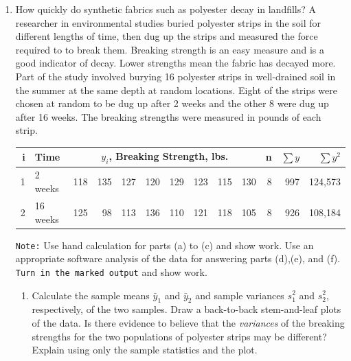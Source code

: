 \documentclass[11pt]{article}
\begin{document}
\begin{enumerate}
\begin{enumerate}
\item Assess the validity of the three conditions necessary for the test used in
part (b) to be valid. Give reasons for assuming that these are satisfied or not to
an acceptable degree? 

\item  On your output, circle the t-statistic for testing the hypothesis you stated in Part (b)and
the p-value associated with it in your output. Extract them from your output
and write them here also.
\item  Extract the  90\% confidence interval for the difference in population 
means as in Part (c) from your output. Write it here and
circle it in the output.

\end{enumerate}
\item How quickly do synthetic fabrics such as polyester decay in landfills? A researcher in environmental studies
buried polyester strips in the soil for different lengths of time, then dug up the strips and measured the force required to to break them.  Breaking strength is an easy measure and is a good indicator of decay. Lower strengths mean the fabric has decayed more. Part of the study involved burying 16 polyester strips in well-drained soil in the summer at the same depth at random locations. Eight of the strips were chosen at random to be dug up after 2 weeks and the other 8 were dug up after 16 weeks. The breaking strengths were measured in pounds of each strip. \\[-.2in] 
\begin{center}
\begin{tabular}[8]{r|l|rrrrrrrr|rrr} \hline
i & Time & \multicolumn{8}{|c|}{$y_i$, Breaking Strength, lbs.} &n &$\sum{y}$ & $\sum{y^2}$\\ \hline
1 & 2 weeks   & 118  & 135 &  127 &  120 &  129 &  123 &  115 &  130 & 8 & 997 & 124,573 \\
2 & 16 weeks 	 & 125 & 98 &   113 &  136 &  110 &  121 &  118 &  105 & 8  & 926 & 108,184\\ \hline
\end{tabular}
\end{center}
{\tt Note:}  Use hand calculation for parts (a) to (c) and show
work. Use an appropriate software analysis of the data for answering parts (d),(e), and (f).
{\tt Turn in the marked output} and show work. 

\begin{enumerate}
\item Calculate the sample means $\bar{y}_1$ and  $\bar{y}_2$ and sample
variances $s_1^2$ and $s_2^2$, respectively, of the two samples. Draw a back-to-back stem-and-leaf plots of the data.
Is there evidence to believe that the \emph{variances} of the breaking strengths for the
two populations of polyester strips may be different? Explain using only the sample statistics and the plot.


\end{enumerate}
\end{enumerate}
\end{document}
